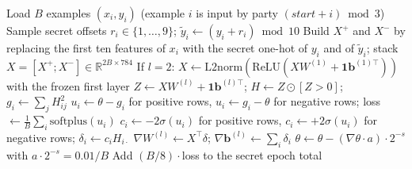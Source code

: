 \begin{algorithm}[ht]
\caption{One local update of layer $l$ in the Secure \ac{ff} program (all values secret-shared; $B\in\{128,8\}$).}
\label{alg:impl-sff}
\begin{algorithmic}[1]
\STATE Load $B$ examples $(x_i,y_i)$ (example $i$ is input by party $(\mathit{start}+i)\bmod3$)
\STATE Sample secret offsets $r_i\in\{1,\dots,9\}$; $\tilde y_i\leftarrow(y_i+r_i)\bmod10$
\STATE Build $X^{+}$ and $X^{-}$ by replacing the first ten features of $x_i$ with the secret one-hot of $y_i$ and of $\tilde y_i$; stack $X=[X^{+};X^{-}]\in\mathbb{R}^{2B\times784}$
\STATE If $l=2$: $X\leftarrow\mathrm{L2norm}(\mathrm{ReLU}(XW^{(1)}+\mathbf{1}\mathbf{b}^{(1)\top}))$ with the frozen first layer
\STATE $Z\leftarrow XW^{(l)}+\mathbf{1}\mathbf{b}^{(l)\top}$; \quad $H\leftarrow Z\odot[Z>0]$; \quad $g_i\leftarrow\sum_j H_{ij}^2$
\STATE $u_i\leftarrow\theta-g_i$ for positive rows, $u_i\leftarrow g_i-\theta$ for negative rows; \quad loss $\leftarrow\frac1B\sum_i\mathrm{softplus}(u_i)$
\STATE $c_i\leftarrow-2\sigma(u_i)$ for positive rows, $c_i\leftarrow+2\sigma(u_i)$ for negative rows; \quad $\delta_i\leftarrow c_i H_{i\cdot}$
\STATE $\nabla W^{(l)}\leftarrow X^\top\delta$; \quad $\nabla\mathbf{b}^{(l)}\leftarrow\sum_i\delta_i$
\STATE $\theta\leftarrow\theta-(\nabla\theta\cdot a)\cdot2^{-s}$ with $a\cdot2^{-s}=0.01/B$
\STATE Add $(B/8)\cdot$loss to the secret epoch total
\end{algorithmic}
\end{algorithm}

